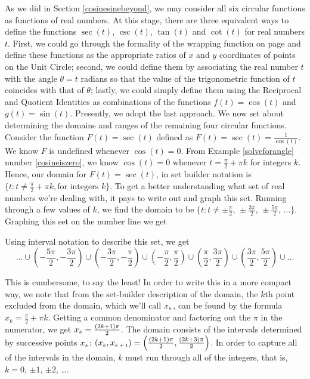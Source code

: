 \medskip

As we did in Section \ref{cosinesinebeyond}, we may consider all six circular functions as functions of real numbers. At this stage, there are three equivalent ways to define the functions $\sec(t)$, $\csc(t)$, $\tan(t)$ and $\cot(t)$ for real numbers $t$.  First, we could go through the formality of the wrapping function on page \pageref{wrappingfunction} and define these functions as the appropriate ratios of  $x$ and $y$ coordinates of points on the Unit Circle;  second, we could define them by associating the real number $t$ with the angle $\theta = t$ radians so that the value of the trigonometric function of $t$ coincides with that of  $\theta$;  lastly, we could simply define them using the Reciprocal and Quotient Identities as combinations of the functions $f(t) = \cos(t)$ and $g(t) = \sin(t)$.  Presently, we adopt the last approach.  We now set about determining the domains and ranges of the remaining four circular functions.  Consider the function $F(t) = \sec(t)$ defined as $F(t) = \sec(t) = \frac{1}{\cos(t)}$.  We know $F$ is undefined whenever $\cos(t) = 0$.  From Example \ref{solveforangle} number \ref{cosineiszero}, we know $\cos(t) = 0$ whenever $t = \frac{\pi}{2} + \pi k$ for integers $k$.  Hence, our domain for $F(t) = \sec(t)$, in set builder notation is  $\{ t : t \neq  \frac{\pi}{2} + \pi k, \text{for integers $k$} \}$.  To get a better understanding what set of real numbers we're dealing with, it pays to write out and graph this set.  Running through a few values of $k$, we find the domain to be  $\{ t : t \neq  \pm \frac{\pi}{2}, \, \pm \frac{3\pi}{2}, \, \pm \frac{5\pi}{2}, \, \ldots \}$.  Graphing this set on the number line we get


\begin{center}
\end{center}

Using interval notation to describe this set, we get  \[ \ldots \cup \left( -\frac{5\pi}{2}, -\frac{3\pi}{2}\right) \cup \left( -\frac{3\pi}{2}, -\frac{\pi}{2}\right) \cup  \left(-\frac{\pi}{2}, \frac{\pi}{2}\right) \cup \left(\frac{\pi}{2}, \frac{3\pi}{2}\right) \cup  \left(\frac{3\pi}{2}, \frac{5\pi}{2}\right) \cup \ldots \]

This is cumbersome, to say the least!  In order to write this in a more compact way, we note that from the set-builder description of the domain, the $k$th point excluded from the domain, which we'll call $x_{\mbox{\tiny $k$}}$, can be found by the formula $x_k =  \frac{\pi}{2} + \pi k$.    Getting a common denominator and factoring out the $\pi$ in the numerator, we get  $x_{\mbox{\tiny $k$}} = \frac{(2k+1)\pi}{2}$.  The domain consists of the intervals determined by successive points $x_{\mbox{\tiny $k$}}$:   $\left(x_{\mbox{\tiny $k$}}, x_{\mbox{\tiny $k+1$}}\right) = \left( \frac{(2k+1)\pi}{2},  \frac{(2k+3)\pi}{2}\right)$.  In order to capture all of the intervals in the domain, $k$ must run through all of the integers, that is, $k = 0$, $\pm 1$, $\pm 2$, \ldots.  
\pagebreak

